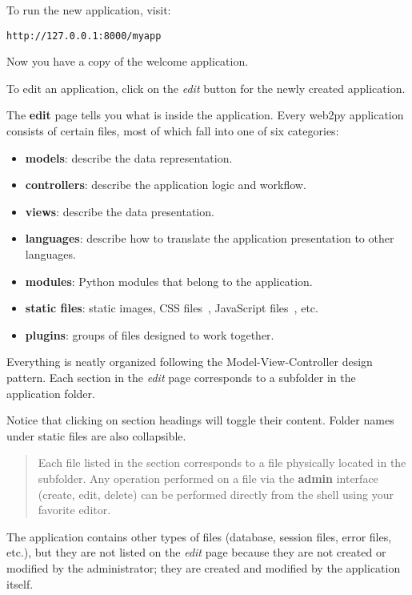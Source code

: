 \documentclass[justified,sixbynine,notoc]{tufte-book}
\begin{document}
\begin{fullwidth}
To run the new application, visit:
\begin{lstlisting}[keywords={}]
http://127.0.0.1:8000/myapp
\end{lstlisting}

Now you have a copy of the welcome application.

To edit an application, click on the {\it edit} button for the newly created application.

The {\bf edit} page tells you what is inside the application.
Every web2py application consists of certain files, most of which fall into one of six categories:
\begin{itemize}
\item {\bf models}: describe the data representation.

\item {\bf controllers}: describe the application logic and workflow.

\item {\bf views}: describe the data presentation.

\item {\bf languages}: describe how to translate the application presentation to other languages.

\item {\bf modules}: Python modules that belong to the application.

\item {\bf static files}: static images, CSS  files~\cite{css-w,css-o,css-school}, JavaScript files~\cite{js-w,js-b}, etc.

\item {\bf plugins}: groups of files designed to work together.
\end{itemize}

Everything is neatly organized following the Model-View-Controller design pattern. Each section in the {\it edit} page corresponds to a subfolder in the application folder.

Notice that clicking on section headings will toggle their content. Folder names under static files are also collapsible.

\begin{quote}Each file listed in the section corresponds to a file physically located in the subfolder. Any operation performed on a file via the {\bf admin} interface (create, edit, delete) can be performed directly from the shell using your favorite editor.\end{quote}
The application contains other types of files (database, session files, error files, etc.), but they are not listed on the {\it edit} page because they are not created or modified by the administrator; they are created and modified by the application itself.


\end{fullwidth}
\end{document}

